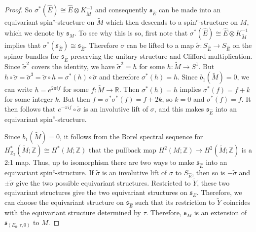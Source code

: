 \documentclass{amsart}
\theoremstyle{definition}
\theoremstyle{remark}
\numberwithin{equation}{section}
\begin{document}
\begin{proof}
So $\sigma^*(\widehat{E}) \cong \widehat{E} \otimes K_{\widetilde{M}}^{-1}$ and consequently $\mathfrak{s}_{\widehat{E}}$ can be made into an equivariant spin$^c$-structure on $\widetilde{M}$ which then descends to a spin$^c$-structure on $M$, which we denote by $\mathfrak{s}_M$. To see why this is so, first note that $\sigma^*(\widehat{E}) \cong \widehat{E} \otimes K_{\widetilde{M}}^{-1}$ implies that $\sigma^*(\mathfrak{s}_{\widehat{E}}) \cong \mathfrak{s}_{\widehat{E}}$. Therefore $\sigma$ can be lifted to a map $\widetilde{\sigma} \colon S_{\widehat{E}} \to S_{\widehat{E}}$ on the spinor bundles for $\mathfrak{s}_{\widehat{E}}$ preserving the unitary structure and Clifford multiplication. Since $\widetilde{\sigma}^2$ covers the identity, we have $\widetilde{\sigma}^2 = h$ for some $h \colon \widetilde{M} \to S^1$. But $h \circ \widetilde{\sigma} = \widetilde{\sigma}^3 = \widetilde{\sigma} \circ h = \sigma^*(h) \circ \widetilde{\sigma}$ and therefore $\sigma^*(h) = h$. Since $b_1(\widetilde{M}) = 0$, we can write $h = e^{2\pi i f}$ for some $f \colon \widetilde{M} \to \mathbb{R}$. Then $\sigma^*(h) = h$ implies $\sigma^*(f) = f + k$ for some integer $k$. But then $f = \sigma^* \sigma^* (f) = f + 2k$, so $k = 0$ and $\sigma^*(f) = f$. It then follows that $e^{-\pi i f} \circ \widetilde{\sigma}$ is an involutive lift of $\sigma$, and this makes $\mathfrak{s}_{\widehat{E}}$ into an equivariant spin$^c$-structure.

Since $b_1(\widetilde{M}) = 0$, it follows from the Borel spectral sequence for $H^*_{\mathbb{Z}_2}(\widetilde{M} ; \mathbb{Z}) \cong H^*(M ; \mathbb{Z})$ that the pullback map $H^2( M ; \mathbb{Z}) \to H^2( \widetilde{M} ; \mathbb{Z})$ is a 2:1 map. Thus, up to isomorphism there are two ways to make $\mathfrak{s}_{\widehat{E}}$ into an equivariant spin$^c$-structure. If $\widetilde{\sigma}$ is an involutive lift of $\sigma$ to $S_{\widehat{E}}$, then so is $-\widetilde{\sigma}$ and $\pm \widetilde{\sigma}$ give the two possible equivariant structures. Restricted to $\widetilde{Y}$, these two equivariant structures give the two equivariant structures on $\mathfrak{s}_E$. Therefore, we can choose the equivariant structure on $\mathfrak{s}_{\widehat{E}}$ such that its restriction to $\widetilde{Y}$  coincides with the equivariant structure determined by $\tau$. Therefore, $\mathfrak{s}_M$ is an extension of $\mathfrak{s}_{(E_0 , \tau , 0)}$ to $M$.


\end{proof}
\end{document}
